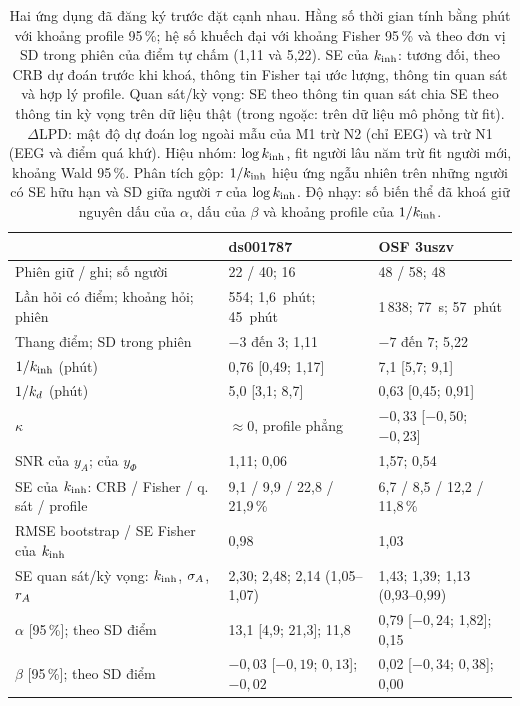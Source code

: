 \begin{table}[htbp]
\centering
\caption{Hai ứng dụng đã đăng ký trước đặt cạnh nhau. Hằng số thời gian tính bằng phút với khoảng profile 95\,\%; hệ số khuếch đại với khoảng Fisher 95\,\% và theo đơn vị SD trong phiên của điểm tự chấm (1,11 và 5,22). SE của $k_{\mathrm{inh}}$: tương đối, theo CRB dự đoán trước khi khoá, thông tin Fisher tại ước lượng, thông tin quan sát và hợp lý profile. Quan sát/kỳ vọng: SE theo thông tin quan sát chia SE theo thông tin kỳ vọng trên dữ liệu thật (trong ngoặc: trên dữ liệu mô phỏng từ fit). $\Delta$LPD: mật độ dự đoán log ngoài mẫu của M1 trừ N2 (chỉ EEG) và trừ N1 (EEG và điểm quá khứ). Hiệu nhóm: $\log k_{\mathrm{inh}}$, fit người lâu năm trừ fit người mới, khoảng Wald 95\,\%. Phân tích gộp: $1/k_{\mathrm{inh}}$ hiệu ứng ngẫu nhiên trên những người có SE hữu hạn và SD giữa người $\tau$ của $\log k_{\mathrm{inh}}$. Độ nhạy: số biến thể đã khoá giữ nguyên dấu của $\alpha$, dấu của $\beta$ và khoảng profile của $1/k_{\mathrm{inh}}$.}
\label{tab:real-compare}
\scriptsize\setlength{\tabcolsep}{3pt}
\begin{tabular}{lll}
\toprule
 & ds001787 & OSF 3uszv \\
\midrule
Phiên giữ / ghi; số người                & 22 / 40; 16 & 48 / 58; 48 \\
Lần hỏi có điểm; khoảng hỏi; phiên      & 554; 1,6~phút; 45~phút & 1\,838; 77~s; 57~phút \\
Thang điểm; SD trong phiên               & $-3$ đến $3$; 1,11 & $-7$ đến $7$; 5,22 \\
$1/k_{\mathrm{inh}}$ (phút)                         & 0,76 [0,49; 1,17] & 7,1 [5,7; 9,1] \\
$1/k_{d}$ (phút)                           & 5,0 [3,1; 8,7] & 0,63 [0,45; 0,91] \\
$\kappa$                                 & $\approx0$, profile phẳng & $-0{,}33$ [$-0{,}50$; $-0{,}23$] \\
SNR của $y_A$; của $y_\Phi$              & 1,11; 0,06 & 1,57; 0,54 \\
SE của $k_{\mathrm{inh}}$: CRB / Fisher / q.\,sát / profile & 9,1 / 9,9 / 22,8 / 21,9\,\% & 6,7 / 8,5 / 12,2 / 11,8\,\% \\
RMSE bootstrap / SE Fisher của $k_{\mathrm{inh}}$   & 0,98 & 1,03 \\
SE quan sát/kỳ vọng: $k_{\mathrm{inh}}$, $\sigma_{A}$, $r_{A}$ & 2,30; 2,48; 2,14 (1,05--1,07) & 1,43; 1,39; 1,13 (0,93--0,99) \\
$\alpha$ [95\,\%]; theo SD điểm          & 13,1 [4,9; 21,3]; 11,8 & 0,79 [$-0{,}24$; 1,82]; 0,15 \\
$\beta$ [95\,\%]; theo SD điểm           & $-0{,}03$ [$-0{,}19$; $0{,}13$]; $-0{,}02$ & 0,02 [$-0{,}34$; $0{,}38$]; 0,00 \\

\end{tabular}
\end{table}
